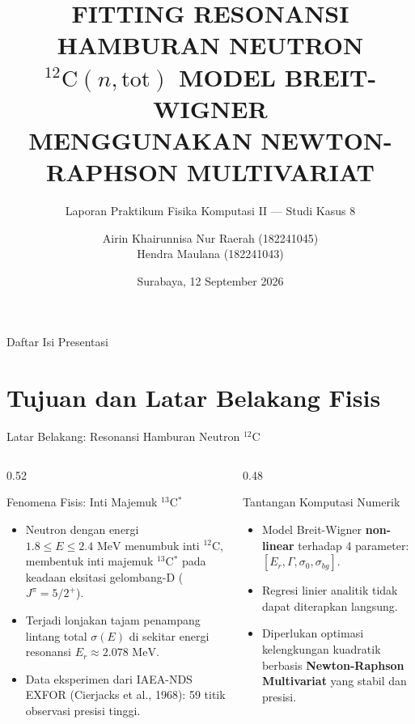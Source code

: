 \documentclass[aspectratio=169, 10pt]{beamer}
\title[Resonansi $^{12}$C Breit-Wigner]{FITTING RESONANSI HAMBURAN NEUTRON\\$^{12}\text{C}(n,\text{tot})$ MODEL BREIT-WIGNER\\MENGGUNAKAN NEWTON-RAPHSON MULTIVARIAT}
\subtitle{Laporan Praktikum Fisika Komputasi II --- Studi Kasus 8}
\author[Kelompok H / Fisika Komputasi II]{
	Airin Khairunnisa Nur Raerah (182241045) \\
	Hendra Maulana (182241043)
}
\institute[UNAIR]{
	Departemen Fisika, Fakultas Sains dan Teknologi, Universitas Airlangga \\
	\medskip
	\textit{Laboratorium Fisika Komputasi}
}
\date[September 2026]{Surabaya, 12 September 2026}
\begin{document}
\begin{frame}[plain]
	\titlepage
\end{frame}

\begin{frame}{Daftar Isi Presentasi}
	\tableofcontents
\end{frame}


\section{Tujuan dan Latar Belakang Fisis}

\begin{frame}{Latar Belakang: Resonansi Hamburan Neutron $^{12}$C}
	\begin{columns}[T]
		\begin{column}{0.52\textwidth}
			\begin{block}{Fenomena Fisis: Inti Majemuk $^{13}$C$^*$}
				\small
				\begin{itemize}
					\item Neutron dengan energi $1.8 \le E \le 2.4\text{ MeV}$ menumbuk inti $^{12}$C, membentuk inti majemuk $^{13}$C$^*$ pada keadaan eksitasi gelombang-D ($J^\pi = 5/2^+$).
					\item Terjadi lonjakan tajam penampang lintang total $\sigma(E)$ di sekitar energi resonansi $E_r \approx 2.078\text{ MeV}$.
					\item Data eksperimen dari IAEA-NDS EXFOR (Cierjacks et al., 1968): 59 titik observasi presisi tinggi.
				\end{itemize}
			\end{block}
		\end{column}

		\begin{column}{0.48\textwidth}
			\begin{alertblock}{Tantangan Komputasi Numerik}
				\small
				\begin{itemize}
					\item Model Breit-Wigner \textbf{non-linear} terhadap 4 parameter: $[E_r, \Gamma, \sigma_0, \sigma_{bg}]$.
					\item Regresi linier analitik tidak dapat diterapkan langsung.
					\item Diperlukan optimasi kelengkungan kuadratik berbasis \textbf{Newton-Raphson Multivariat} yang stabil dan presisi.
				\end{itemize}
			\end{alertblock}
		\end{column}
	\end{columns}
\end{frame}
\end{document}
